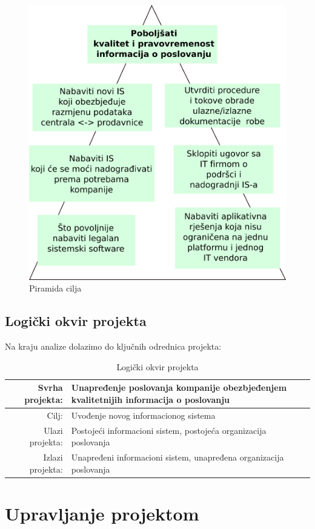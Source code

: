 \documentclass[times, utf8, seminar]{fit}
\begin{document}
\begin{figure}[H]
\centering
\includegraphics[width=12cm]{img/piramida_cilja.png}
\caption{Piramida cilja}
\end{figure}

\section{Logički okvir projekta}
Na kraju analize dolazimo do ključnih odrednica projekta:
\begin{table}[h]
\resizebox{15cm}{!} {
\begin{tabular}{ | r | l | }
\hline
Svrha projekta: & Unapređenje poslovanja kompanije obezbjeđenjem kvalitetnijih informacija o poslovanju \\ \hline
Cilj: & Uvođenje novog informacionog sistema \\ \hline
Ulazi projekta: & Postojeći informacioni sistem, postojeća organizacija poslovanja \\ \hline
Izlazi projekta: & Unapređeni informacioni sistem, unapređena organizacija poslovanja \\ \hline
\end{tabular}
}

\caption{Logički okvir projekta}
\end{table}


\chapter{Upravljanje projektom}
\end{document}

